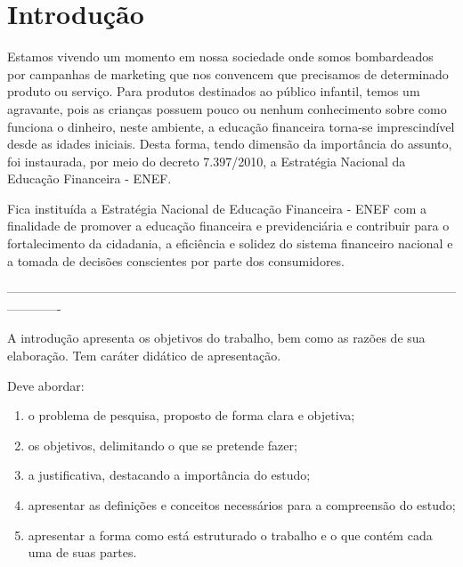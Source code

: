 


\chapter{Introdução}

Estamos vivendo um momento em nossa sociedade onde somos bombardeados por campanhas de marketing que nos convencem que precisamos de determinado produto ou serviço. Para produtos destinados ao público infantil, temos um agravante, pois as crianças possuem pouco ou nenhum conhecimento sobre como funciona o dinheiro, neste ambiente, a educação financeira torna-se imprescindível desde as idades iniciais.   Desta forma, tendo dimensão da importância do assunto, foi instaurada, por meio do decreto 7.397/2010, a Estratégia Nacional da Educação Financeira - ENEF.
\begin{citacao}
	Fica instituída a Estratégia Nacional de Educação Financeira - ENEF com a finalidade de promover a educação financeira e previdenciária e contribuir para o fortalecimento da cidadania, a eficiência e solidez do sistema financeiro nacional e a tomada de decisões conscientes por parte dos consumidores.
	\cite{decreto_7397}
\end{citacao} 











-------------------------------------------------------------------------------------------------------------------------

A introdução apresenta os objetivos do trabalho, bem como as razões de sua elaboração. Tem caráter didático de apresentação.

Deve abordar:
\begin{enumerate}[noitemsep,nosep,labelindent=\parindent,leftmargin=*,label={\alph*}) ] 
	\item o problema de pesquisa, proposto de forma clara e objetiva;
	\item os objetivos, delimitando o que se pretende fazer;
	\item a justificativa, destacando a importância do estudo;
	\item apresentar as definições e conceitos necessários para a compreensão do estudo;
	\item apresentar a forma como está estruturado o trabalho e o que contém cada uma de suas partes.
\end{enumerate}

